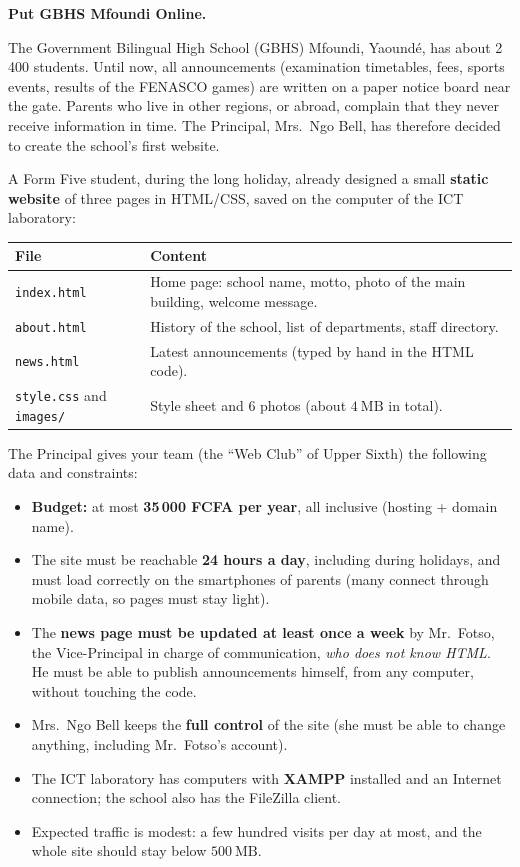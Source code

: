 \documentclass[11pt]{article}
\newcounter{popsec}
\newcounter{popsub}
\newcommand{\courssub}[1]{%
  \stepcounter{popsub}%
  \par\vspace{9pt}\noindent{\popxbold\fontsize{11.5}{13}\selectfont\color{popink}{\color{poporange}\thepopsec.\thepopsub}\hspace{6pt}#1}\par\nopagebreak\vspace{4pt}
}
\begin{document}
\courssub{Situation}

\textbf{Put GBHS Mfoundi Online.}\par

The Government Bilingual High School (GBHS) Mfoundi, Yaoundé, has about 2\,400 students. Until now, all announcements (examination timetables, fees, sports events, results of the FENASCO games) are written on a paper notice board near the gate. Parents who live in other regions, or abroad, complain that they never receive information in time. The Principal, Mrs.\ Ngo Bell, has therefore decided to create the school's first website.

A Form Five student, during the long holiday, already designed a small \textbf{static website} of three pages in HTML/CSS, saved on the computer of the ICT laboratory:

\begin{center}
\begin{tabularx}{\linewidth}{|l|X|}
\hline
\rowcolor{popblueL} \textbf{File} & \textbf{Content} \\
\hline
\texttt{index.html} & Home page: school name, motto, photo of the main building, welcome message. \\
\hline
\texttt{about.html} & History of the school, list of departments, staff directory. \\
\hline
\texttt{news.html} & Latest announcements (typed by hand in the HTML code). \\
\hline
\texttt{style.css} and \texttt{images/} & Style sheet and 6 photos (about $4\ \mathrm{MB}$ in total). \\
\hline
\end{tabularx}
\end{center}

The Principal gives your team (the ``Web Club'' of Upper Sixth) the following data and constraints:

\begin{itemize}
\item \textbf{Budget:} at most \textbf{35\,000 FCFA per year}, all inclusive (hosting + domain name).
\item The site must be reachable \textbf{24 hours a day}, including during holidays, and must load correctly on the smartphones of parents (many connect through mobile data, so pages must stay light).
\item The \textbf{news page must be updated at least once a week} by Mr.\ Fotso, the Vice-Principal in charge of communication, \emph{who does not know HTML}. He must be able to publish announcements himself, from any computer, without touching the code.
\item Mrs.\ Ngo Bell keeps the \textbf{full control} of the site (she must be able to change anything, including Mr.\ Fotso's account).
\item The ICT laboratory has computers with \textbf{XAMPP} installed and an Internet connection; the school also has the FileZilla client.
\item Expected traffic is modest: a few hundred visits per day at most, and the whole site should stay below $500\ \mathrm{MB}$.
\end{itemize}
\end{document}
